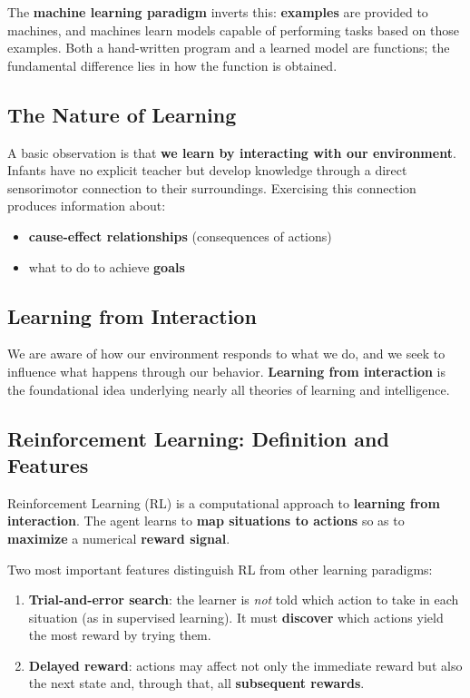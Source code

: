 \documentclass[11pt,a4paper]{article}
\theoremstyle{definition}
\theoremstyle{plain}
\theoremstyle{remark}
\begin{document}
The \textbf{machine learning paradigm} inverts this: \textbf{examples} are provided to machines, and machines learn models capable of performing tasks based on those examples. Both a hand-written program and a learned model are functions; the fundamental difference lies in how the function is obtained.

\subsection{The Nature of Learning}

A basic observation is that \textbf{we learn by interacting with our environment}. Infants have no explicit teacher but develop knowledge through a direct sensorimotor connection to their surroundings. Exercising this connection produces information about:
\begin{itemize}
    \item \textbf{cause-effect relationships} (consequences of actions)
    \item what to do to achieve \textbf{goals}
\end{itemize}

\subsection{Learning from Interaction}

We are aware of how our environment responds to what we do, and we seek to influence what happens through our behavior. \textbf{Learning from interaction} is the foundational idea underlying nearly all theories of learning and intelligence.

\subsection{Reinforcement Learning: Definition and Features}

\begin{tcolorbox}[colback=blue!5!white,colframe=blue!60!black,title=\textbf{Reinforcement Learning}]
Reinforcement Learning (RL) is a computational approach to \textbf{learning from interaction}. The agent learns to \textbf{map situations to actions} so as to \textbf{maximize} a numerical \textbf{reward signal}.
\end{tcolorbox}

Two most important features distinguish RL from other learning paradigms:

\begin{enumerate}
    \item \textbf{Trial-and-error search}: the learner is \textit{not} told which action to take in each situation (as in supervised learning). It must \textbf{discover} which actions yield the most reward by trying them.
    \item \textbf{Delayed reward}: actions may affect not only the immediate reward but also the next state and, through that, all \textbf{subsequent rewards}.
\end{enumerate}
\end{document}
